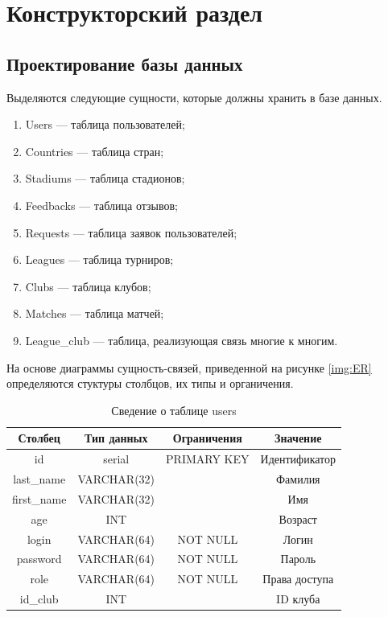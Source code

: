 \section{Конструкторский раздел}
\subsection{Проектирование базы данных}

Выделяются следующие сущности, которые должны хранить в базе данных.

\begin{enumerate}[left=36pt]
	\item Users --- таблица пользователей;
	\item Countries --- таблица стран;
	\item Stadiums --- таблица стадионов;
	\item Feedbacks --- таблица отзывов;
	\item Requests --- таблица заявок пользователей;
	\item Leagues --- таблица турниров;
	\item Clubs --- таблица клубов;
	\item Matches --- таблица матчей;
	\item League\_club --- таблица, реализующая связь многие к многим.
\end{enumerate}

На основе диаграммы сущность-связей, приведенной на рисунке \ref{img:ER} определяются стуктуры столбцов, их типы и органичения.

\begin{table}[H]
	\begin{center}
		\caption{Сведение о таблице users}
		\begin{tabular}{|c|c|c|c|}
			\hline
			Столбец & Тип данных & Ограничения & Значение \\
			\hline
			id & serial & PRIMARY KEY & Идентификатор \\
			\hline
			last\_name & VARCHAR(32) & & Фамилия \\
			\hline
			first\_name & VARCHAR(32) & & Имя\\
			\hline
			age & INT &  & Возраст\\
			\hline
			login & VARCHAR(64) & NOT NULL &  Логин \\
			\hline
			password & VARCHAR(64) & NOT NULL & Пароль \\
			\hline
			role & VARCHAR(64) & NOT NULL & Права доступа \\
			\hline
			id\_club & INT &  & ID клуба \\
			\hline			
		\end{tabular}
		\label{table:db:users}
	\end{center}
\end{table}

